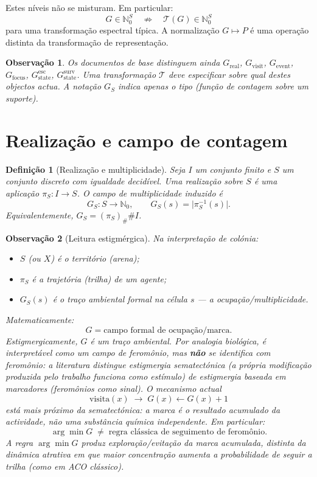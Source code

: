 \documentclass[11pt,a4paper]{article}
\newtheorem{definicao}{Definição}
\newtheorem{observacao}{Observação}
\begin{document}
Estes níveis não se misturam. Em particular:
\[
G\in\mathbb N_0^S\quad\not\Rightarrow\quad
\mathcal T(G)\in\mathbb N_0^S
\]
para uma transformação espectral típica. A normalização \(G\mapsto P\) é uma operação distinta da transformação de representação.

\begin{observacao}
Os documentos de base distinguem ainda \(G_{\mathrm{real}}\), \(G_{\mathrm{visit}}\), \(G_{\mathrm{event}}\), \(G_{\mathrm{focus}}\), \(G_{\mathrm{state}}^{\mathrm{esc}}\), \(G_{\mathrm{state}}^{\mathrm{surv}}\). Uma transformação \(\mathcal T\) deve especificar sobre qual destes objectos actua. A notação \(G_S\) indica apenas o tipo (função de contagem sobre um suporte).
\end{observacao}

\section{Realização e campo de contagem}

\begin{definicao}[Realização e multiplicidade]
\label{def:realizacao}
Seja \(I\) um conjunto finito e \(S\) um conjunto discreto com igualdade decidível. Uma realização sobre \(S\) é uma aplicação \(\pi_S\colon I\to S\). O campo de multiplicidade induzido é
\[
G_S\colon S\to\mathbb N_0,\qquad
G_S(s)=\lvert\pi_S^{-1}(s)\rvert.
\]
Equivalentemente, \(G_S=(\pi_S)_{\#}\#I\).
\end{definicao}

\begin{observacao}[Leitura estigmérgica]
\label{obs:leitura-estigmergica}
Na interpretação de colónia:
\begin{itemize}[leftmargin=1.5em]
\item \(S\) (ou \(X\)) é o \emph{território} (arena);
\item \(\pi_S\) é a \emph{trajetória} (trilha) de um agente;
\item \(G_S(s)\) é o \emph{traço ambiental} formal na célula \(s\) --- a ocupação/multiplicidade.
\end{itemize}
Matematicamente:
\[
\boxed{G=\text{campo formal de ocupação/marca}}.
\]
Estigmergicamente, \(G\) é um traço ambiental. Por analogia biológica, é interpretável como um campo de feromônio, mas \textbf{não} se identifica com feromônio: a literatura distingue estigmergia sematectónica (a própria modificação produzida pelo trabalho funciona como estímulo) de estigmergia baseada em marcadores (feromônios como sinal). O mecanismo actual
\[
\text{visita}(x)\;\longrightarrow\;G(x)\leftarrow G(x)+1
\]
está mais próximo da sematectónica: a marca é o resultado acumulado da actividade, não uma substância química independente. Em particular:
\[
\boxed{\arg\min G\;\neq\;\text{regra clássica de seguimento de feromônio}}.
\]
A regra \(\arg\min G\) produz exploração/evitação da marca acumulada, distinta da dinâmica atrativa em que maior concentração aumenta a probabilidade de seguir a trilha (como em ACO clássico).
\end{observacao}
\end{document}
